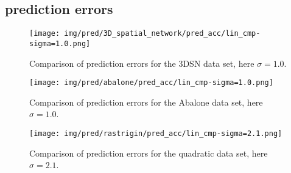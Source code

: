 \subsection{prediction errors}
\hfill


\begin{figure}[ht]
    \centering
    \texttt{[image: img/pred/3D\_spatial\_network/pred\_acc/lin\_cmp-sigma=1.0.png]}
    \caption{Comparison of prediction errors for the 3DSN data set, here $\sigma=1.0$.}
    \label{fig: minres-cg-3dsn-ferr}
\end{figure}


\begin{figure}[ht]
    \centering
    \texttt{[image: img/pred/abalone/pred\_acc/lin\_cmp-sigma=1.0.png]}
    \caption{Comparison of prediction errors for the Abalone data set, here $\sigma=1.0$.}
    \label{fig: minres-cg-aba-ferr}
\end{figure}


\begin{figure}[ht]
    \centering
    \texttt{[image: img/pred/rastrigin/pred\_acc/lin\_cmp-sigma=2.1.png]}
    \caption{Comparison of prediction errors for the quadratic data set, here $\sigma=2.1$.}
    \label{fig: minres-cg-quad-ferr}
\end{figure}



